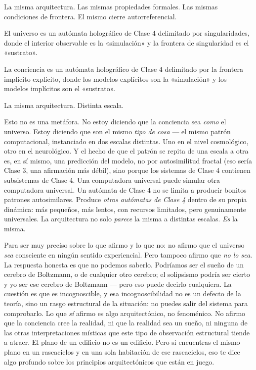 \documentclass[11pt, twoside, openright]{book}
\begin{document}
La misma arquitectura. Las mismas propiedades formales. Las mismas condiciones de frontera. El mismo cierre autorreferencial.

El universo es un autómata holográfico de Clase 4 delimitado por singularidades, donde el interior observable es la «simulación» y la frontera de singularidad es el «sustrato».

La conciencia es un autómata holográfico de Clase 4 delimitado por la frontera implícito-explícito, donde los modelos explícitos son la «simulación» y los modelos implícitos son el «sustrato».

La misma arquitectura. Distinta escala.

Esto no es una metáfora. No estoy diciendo que la conciencia sea \textit{como} el universo. Estoy diciendo que son el mismo \textit{tipo de cosa} --- el mismo patrón computacional, instanciado en dos escalas distintas. Uno en el nivel cosmológico, otro en el neurológico. Y el hecho de que el patrón se repita de una escala a otra es, en sí mismo, una predicción del modelo, no por autosimilitud fractal (eso sería Clase 3, una afirmación más débil), sino porque los sistemas de Clase 4 contienen subsistemas de Clase 4. Una computadora universal puede simular otra computadora universal. Un autómata de Clase 4 no se limita a producir bonitos patrones autosimilares. Produce \textit{otros autómatas de Clase 4} dentro de su propia dinámica: más pequeños, más lentos, con recursos limitados, pero genuinamente universales. La arquitectura no solo \textit{parece} la misma a distintas escalas. \textit{Es} la misma.

Para ser muy preciso sobre lo que afirmo y lo que no: no afirmo que el universo \textit{sea} consciente en ningún sentido experiencial. Pero tampoco afirmo que \textit{no lo sea}. La respuesta honesta es que no podemos saberlo. Podríamos ser el sueño de un cerebro de Boltzmann, o de cualquier otro cerebro; el solipsismo podría ser cierto y yo ser ese cerebro de Boltzmann --- pero eso puede decirlo cualquiera. La cuestión es que es incognoscible, y esa incognoscibilidad no es un defecto de la teoría, sino un rasgo estructural de la situación: no puedes salir del sistema para comprobarlo. Lo que \textit{sí} afirmo es algo arquitectónico, no fenoménico. No afirmo que la conciencia cree la realidad, ni que la realidad sea un sueño, ni ninguna de las otras interpretaciones místicas que este tipo de observación estructural tiende a atraer. El plano de un edificio no es un edificio. Pero si encuentras el mismo plano en un rascacielos y en una sola habitación de ese rascacielos, eso te dice algo profundo sobre los principios arquitectónicos que están en juego.
\end{document}

